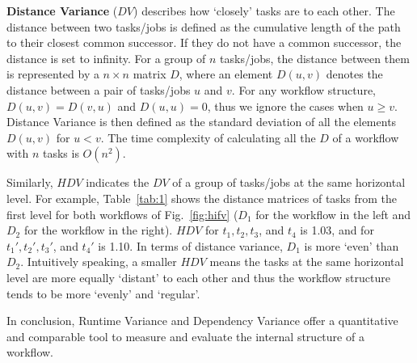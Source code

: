 \textbf{Distance Variance} ($DV$) describes how `closely' tasks are to each other. The distance between two tasks/jobs is defined as the cumulative length of the path to their closest common successor. If they do not have a common successor, the distance is set to infinity. For a group of $n$ tasks/jobs, the distance between them is represented by a $n \times n$ matrix $D$, where an element $D(u,v)$ denotes the distance between a pair of tasks/jobs $u$ and $v$. For any workflow structure, $D(u,v)=D(v,u)$ and $D(u,u)=0$, thus we ignore the cases when $u \geq v$. Distance Variance is then defined as the standard deviation of all the elements $D(u,v)$ for $u<v$. The time complexity of calculating all the $D$ of a workflow with $n$ tasks is $O(n^2)$. 

Similarly, $HDV$ indicates the $DV$ of a group of tasks/jobs at the same horizontal level. For example, Table~\ref{tab:1} shows the distance matrices of tasks from the first level for both workflows of Fig.~\ref{fig:hifv} ($D_1$ for the workflow in the left and $D_2$ for the workflow in the right). $HDV$ for $t_1, t_2, t_3$, and $t_4$ is 1.03, and for $t_1', t_2', t_3'$, and $t_4'$ is 1.10. In terms of distance variance, $D_1$ is more `even' than $D_2$. Intuitively speaking, a smaller $HDV$ means the tasks at the same horizontal level are more equally `distant' to each other and thus the workflow structure tends to be more `evenly' and `regular'. 

In conclusion, Runtime Variance and Dependency Variance offer a quantitative and comparable tool to measure and evaluate the internal structure of a workflow. 



